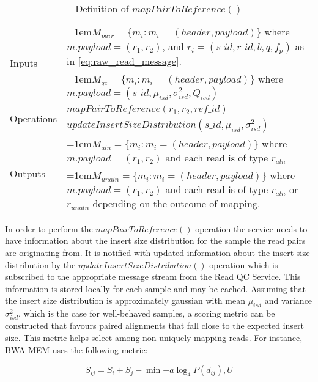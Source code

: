 \bgroup
\def\arraystretch{1.5}
\begin{table}[!ht]
    \caption{Definition of $mapPairToReference()$}
    \label{tab:op_map_pair_to_reference}
    {\begin{tabular}{l|p{12cm}}
    \toprule
    \multirow{2}{*}{Inputs} & \hangindent=1em$M_{pair} = \{m_i: m_i = (header, payload)\}$ where $m.payload = (r_1,r_2)$, and $r_i = (s\_id, r\_id, b, q, f_p)$ as in \ref{eq:raw_read_message}. \\
    & \hangindent=1em$M_{qc} = \{m_i: m_i = (header, payload)\}$ where $m.payload = (s\_id, \mu_{isd}, \sigma_{isd}^2, Q_{isd})$\\
    \cline{2-2}
    \multirow{2}{*}{Operations} & $mapPairToReference(r_1,r_2, ref\_id)$\\
    & $updateInsertSizeDistribution(s\_id,\mu_{isd}, \sigma_{isd}^2)$\\
    \cline{2-2}
    \multirow{2}{*}{Outputs} & \hangindent=1em$M_{aln} = \{m_i: m_i = (header, payload)\}$ where $m.payload = (r_1,r_2)$ and each read is of type $r_{aln}$\\
    & \hangindent=1em$M_{unaln} = \{m_i: m_i = (header, payload)\}$ where $m.payload = (r_1,r_2)$ and each read is of type $r_{aln}$ or $r_{unaln}$ depending on the outcome of mapping.\\
    \bottomrule
    \end{tabular}}
\end{table}
\egroup

In order to perform the $mapPairToReference()$ operation the service needs to have information about the insert size distribution for the sample the read pairs are originating from. It is notified with updated information about the insert size distribution by the $updateInsertSizeDistribution()$ operation which is subscribed to the appropriate message stream from the Read QC Service. This information is stored locally for each sample and may be cached. Assuming that the insert size distribution is approximately gaussian with mean $\mu_{isd}$ and variance $\sigma_{isd}^2$, which is the case for well-behaved samples, a scoring metric can be constructed that favours paired alignments that fall close to the expected insert size. This metric helps select among non-uniquely mapping reads. For instance, BWA-MEM uses the following metric:

\begin{equation}
    S_{ij}=S_i + S_j - \min{-a\log_4P(d_{ij}),U}
\end{equation}


